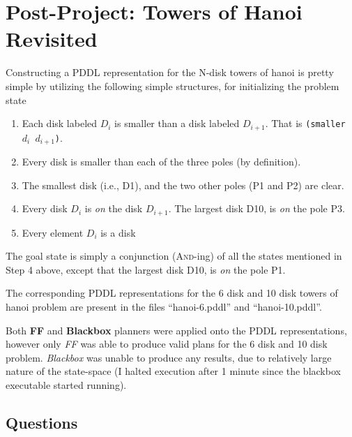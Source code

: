 \documentclass[10pt, letter]{article}
\begin{document}
\section{Post-Project: Towers of Hanoi Revisited}
Constructing a PDDL representation for the N-disk towers of hanoi is pretty simple by utilizing the following simple structures, for initializing the problem state
\begin{enumerate}
\item Each disk labeled $D_i$ is smaller than a disk labeled $D_{i+1}$. That is \texttt{(smaller $d_i$ $d_{i+1}$)}.
\item Every disk is smaller than each of the three poles (by definition).
\item The smallest disk (i.e., D1), and the two other poles (P1 and P2) are clear.
\item Every disk $D_i$ is \emph{on} the disk $D_{i+1}$. The largest disk D10, is \emph{on} the pole P3.
\item Every element $D_i$ is a disk
\end{enumerate}
The goal state is simply a conjunction (\textsc{And}-ing) of all the states mentioned in Step 4 above, except that the largest disk D10, is \emph{on} the pole P1.

The corresponding PDDL representations for the 6 disk and 10 disk towers of hanoi problem are present in the files ``hanoi-6.pddl'' and ``hanoi-10.pddl''.

Both \textbf{FF} and \textbf{Blackbox} planners were applied onto the PDDL representations, however only \textit{FF} was able to produce valid plans for the 6 disk and 10 disk problem. \textit{Blackbox} was unable to produce any results, due to relatively large nature of the state-space (I halted execution after 1 minute since the blackbox executable started running).

\subsection{Questions}
\end{document}
